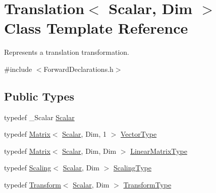\hypertarget{class_translation}{\section{Translation$<$ Scalar, Dim $>$ Class Template Reference}
\label{class_translation}
}


Represents a translation transformation.  




{\ttfamily \#include $<$Forward\-Declarations.\-h$>$}

\subsection*{Public Types}
\begin{DoxyCompactItemize}
\item 
typedef \-\_\-\-Scalar \hyperlink{class_translation_a3ac09e6bdde38180bd4144846e760226}{Scalar}
\item 
typedef \hyperlink{class_matrix}{Matrix}$<$ \hyperlink{class_translation_a3ac09e6bdde38180bd4144846e760226}{Scalar}, Dim, 1 $>$ \hyperlink{class_translation_a1b1ee9d6d92ffebecdb94e4827653ef2}{Vector\-Type}
\item 
typedef \hyperlink{class_matrix}{Matrix}$<$ \hyperlink{class_translation_a3ac09e6bdde38180bd4144846e760226}{Scalar}, Dim, Dim $>$ \hyperlink{class_translation_a4e4dc4e17b8a4d243682fa2d9bbeaa38}{Linear\-Matrix\-Type}
\item 
typedef \hyperlink{class_scaling}{Scaling}$<$ \hyperlink{class_translation_a3ac09e6bdde38180bd4144846e760226}{Scalar}, Dim $>$ \hyperlink{class_translation_ae1c92ee9e56b88d3355c9551b171279f}{Scaling\-Type}
\item 
typedef \hyperlink{class_transform}{Transform}$<$ \hyperlink{class_translation_a3ac09e6bdde38180bd4144846e760226}{Scalar}, Dim $>$ \hyperlink{class_translation_a17aa136dd5b74ba443a87887a77e6e3b}{Transform\-Type}
\end{DoxyCompactItemize}
